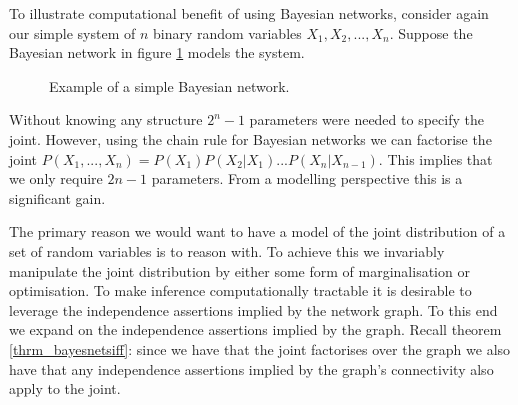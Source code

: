 To illustrate computational benefit of using Bayesian networks, consider again our simple system of $n$ binary random variables $X_1,X_2,...,X_n$. Suppose the Bayesian network in figure \ref{fig_bnet} models the system.
\begin{figure}[H] 
\centering
{}
\caption{Example of a simple Bayesian network.}
\label{fig_bnet}
\end{figure}
Without knowing any structure $2^{n}-1$ parameters were needed to specify the joint. However, using the chain rule for Bayesian networks we can factorise the joint $P(X_1,...,X_n) = P(X_1)P(X_2|X_1)...P(X_n|X_{n-1})$. This implies that we only require $2n-1$ parameters. From a modelling perspective this is a significant gain.

The primary reason we would want to have a model of the joint distribution of a set of random variables is to reason with. To achieve this we invariably manipulate the joint distribution by either some form of marginalisation or optimisation. To make inference computationally tractable it is desirable to leverage the independence assertions implied by the network graph. To this end we expand on the independence assertions implied by the graph. Recall theorem \ref{thrm_bayesnetsiff}: since we have that the joint factorises over the graph we also have that any independence assertions implied by the graph's connectivity also apply to the joint.

